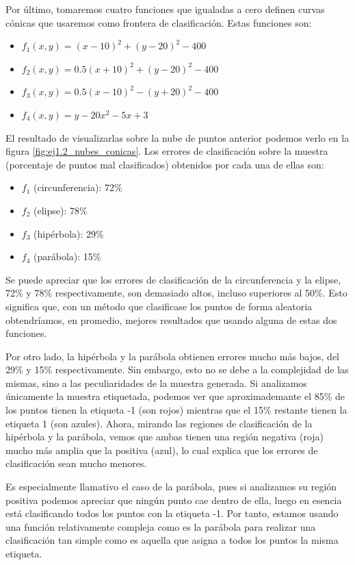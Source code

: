 \documentclass[10pt,a4paper]{article}
\begin{document}
Por último, tomaremos cuatro funciones que igualadas a cero definen curvas cónicas que usaremos como frontera de clasificación. Estas funciones son:

\begin{itemize}
	\item $f_1(x,y) = (x-10)^2 + (y-20)^2 - 400$
	\item $f_2(x,y) = 0.5(x+10)^2 + (y-20)^2 - 400$
	\item $f_3(x,y) = 0.5(x-10)^2 - (y+20)^2 - 400$
	\item $f_4(x,y) = y - 20x^2 - 5x + 3$
\end{itemize}

El resultado de visualizarlas sobre la nube de puntos anterior podemos verlo en la figura \ref{fig:ej1.2_nubes_conicas}. Los errores de clasificación sobre la muestra (porcentaje de puntos mal clasificados) obtenidos por cada una de ellas son:

\begin{itemize}
	\item $f_1$ (circunferencia): 72\%
	\item $f_2$ (elipse): 78\%
	\item $f_3$ (hipérbola): 29\%
	\item $f_4$ (parábola): 15\%
\end{itemize}

Se puede apreciar que los errores de clasificación de la circunferencia y la elipse, 72\% y 78\% respectivamente, son demasiado altos, incluso superiores al 50\%. Esto significa que, con un método que clasificase los puntos de forma aleatoria obtendríamos, en promedio, mejores resultados que usando alguna de estas dos funciones. 

Por otro lado, la hipérbola y la parábola obtienen errores mucho más bajos, del 29\% y 15\% respectivamente. Sin embargo, esto no se debe a la complejidad de las mismas, sino a las peculiaridades de la muestra generada. Si analizamos únicamente la muestra etiquetada, podemos ver que aproximademante el 85\% de los puntos tienen la etiqueta -1 (son rojos) mientras que el 15\% restante tienen la etiqueta 1 (son azules). Ahora, mirando las regiones de clasificación de la hipérbola y la parábola, vemos que ambas tienen una región negativa (roja) mucho más amplia que la positiva (azul), lo cual explica que los errores de clasificación sean mucho menores.

Es especialmente llamativo el caso de la parábola, pues si analizamos su región positiva podemos apreciar que ningún punto cae dentro de ella, luego en esencia está clasificando todos los puntos con la etiqueta -1. Por tanto, estamos usando una función relativamente compleja como es la parábola para realizar una clasificación tan simple como es aquella que asigna a todos los puntos la misma etiqueta.
\end{document}
